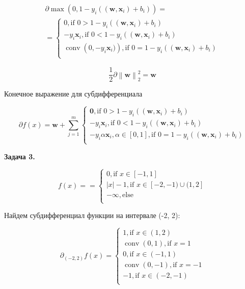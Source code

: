 \documentclass[12pt]{article}
\DeclareMathOperator*{\conv}{conv}
\newcommand\norm[1]{\left\lVert#1\right\rVert}
\begin{document}
\begin{eqnarray}
\partial \max \left(0, 1-y_i((\textbf{w},\textbf{x}_i) + b_i)\right) = \nonumber\\
=\begin{cases}
0, \text{if $0 > 1-y_i((\textbf{w},\textbf{x}_i) + b_i)$} \\
-y_i\textbf{x}_i, \text{if $0 < 1-y_i((\textbf{w},\textbf{x}_i) + b_i)$} \\
\conv\left(0, -y_i\textbf{x}_i)\right), \text{if $0 = 1-y_i((\textbf{w},\textbf{x}_i) + b_i)$} \\
\end{cases}
\end{eqnarray}

\begin{equation}
\frac{1}{2}\partial\norm{\textbf{w}}_2^2 = \textbf{w}
\end{equation}

Конечное выражение для субдифференциала

\begin{equation}
\boxed{\partial f(x) = \textbf{w} +
\sum\limits_{j=1}^m
\begin{cases}
\textbf{0}, \text{if $0 > 1-y_i((\textbf{w},\textbf{x}_i) + b_i)$} \\
-y_i\textbf{x}_i, \text{if $0 < 1-y_i((\textbf{w},\textbf{x}_i) + b_i)$} \\
-y_i\alpha\textbf{x}_i, \alpha\in[0, 1], \text{if $0 = 1-y_i((\textbf{w},\textbf{x}_i) + b_i)$} \\
\end{cases}}
\end{equation}

\begin{center}
	\textbf{Задача 3.}
\end{center}

\begin{equation}
f(x)=
=\begin{cases}
0, \text{if $x \in [-1, 1]$}\\
|x|-1, \text{if $x \in [-2, -1) \cup (1, 2]$}\\
-\infty, \text{else}\\
\end{cases}
\end{equation}

Найдем субдифференциал функции на интервале (-2, 2):

\begin{equation}
\partial_{(-2, 2)} f(x)=
\begin{cases}
1, \text{if $x \in (1, 2)$}\\
\conv\left(0, 1\right), \text{if $x = 1$}\\
0, \text{if $x \in (-1, 1)$}\\
\conv\left(0, -1\right), \text{if $x = -1$}\\
-1, \text{if $x \in (-2, -1)$}\\
\end{cases}
\end{equation}
\end{document}
